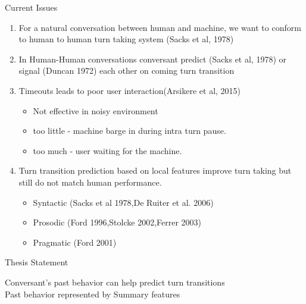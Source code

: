 \begin{frame}{Current Issues}
    \begin{enumerate}[<+->]\itemsep9pt
      \item For a natural conversation between human and machine, we want to conform
            to human to human turn taking system (Sacks et al, 1978)
      \item In Human-Human conversations conversant predict (Sacks et al, 1978) or
            signal (Duncan 1972) each other on coming turn transition
      \item {
        Timeouts leads to poor user interaction(Arsikere et al, 2015)
        \begin{itemize}
            \item Not effective in noisy environment
            \item too little - machine barge in during intra turn pause.
            \item too much - user waiting for the machine.
        \end{itemize}
      }
      \item {
        Turn transition prediction based on local features improve turn taking but still
        do not match human performance.
        \begin{itemize}
            \item Syntactic (Sacks et al 1978,De Ruiter et al. 2006)
            \item Prosodic (Ford 1996,Stolcke 2002,Ferrer 2003)
            \item Pragmatic (Ford 2001)
        \end{itemize}
      }
    \end{enumerate}
\end{frame}

\begin{frame} {Thesis Statement}
 \begin{center}

        \Large{Conversant's past behavior can help predict turn transitions}\\
        \vspace{10mm}
        \Large{Past behavior represented by Summary features}
 \end{center}

\end{frame}

